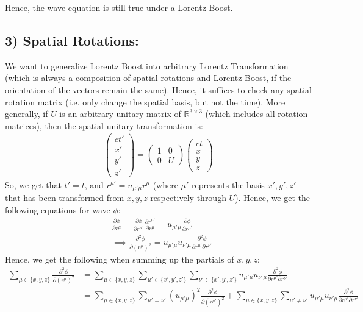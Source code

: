 \documentclass{article}
\newcommand{\RR}{\mathbb{R}}
\begin{document}
Hence, the wave equation is still true under a Lorentz Boost.

\subsection*{3) Spatial Rotations:}
We want to generalize Lorentz Boost into arbitrary Lorentz Transformation (which is always a composition of spatial rotations and Lorentz Boost, if the orientation of the vectors remain the same). Hence, it suffices to check any spatial rotation matrix (i.e. only change the spatial basis, but not the time). More generally, if $U$ is an arbitrary unitary matrix of $\RR^{3\times 3}$ (which includes all rotation matrices), then the spatial unitary transformation is:
\begin{align}
    \begin{pmatrix}
        ct'\\x'\\y'\\z'
    \end{pmatrix}=\left(\begin{array}{c|c}
        1 & 0\\
        \hline
        0 & U
    \end{array}\right)\begin{pmatrix}
        ct\\x\\y\\z
    \end{pmatrix}
\end{align}
So, we get that $t' = t$, and $r^{\mu'} = u_{\mu'\mu}r^\mu$ (where $\mu'$ represents the basis $x',y',z'$ that has been transformed from $x,y,z$ respectively through $U$). Hence, we get the following equations for wave $\phi$:
\begin{align}
    &\frac{\partial\phi}{\partial r^\mu} = \frac{\partial\phi}{\partial r^{\mu'}}\frac{\partial r^{\mu'}}{\partial r^\mu} = u_{\mu'\mu}\frac{\partial\phi}{\partial r^{\mu'}}\\
    &\implies \frac{\partial^2\phi}{\partial (r^\mu)^2} = u_{\mu'\mu}u_{\nu'\mu}\frac{\partial^2\phi}{\partial r^{\mu'}\partial r^{\nu'}}
\end{align}
Hence, we get the following when summing up the partials of $x,y,z$:
\begin{align}
    \sum_{\mu \in \{x,y,z\}}\frac{\partial^2\phi}{\partial (r^\mu)^2} &= \sum_{\mu\in\{x,y,z\}}\sum_{\mu'\in\{x',y',z'\}}\sum_{\nu'\in\{x',y',z'\}}u_{\mu'\mu}u_{\nu'\mu}\frac{\partial^2\phi}{\partial r^{\mu'}\partial r^{\nu'}}\\
    &= \sum_{\mu\in\{x,y,z\}}\sum_{\mu'=\nu'}(u_{\mu'\mu})^2\frac{\partial^2\phi}{\partial (r^{\mu'})^2} + \sum_{\mu\in \{x,y,z\}}\sum_{\mu'\neq \nu'}u_{\mu'\mu}u_{\nu'\mu}\frac{\partial^2\phi}{\partial r^{\mu'}\partial r^{\nu'}}
\end{align}
\end{document}
